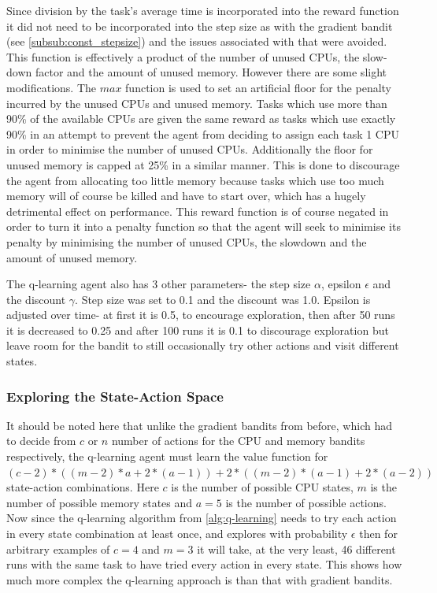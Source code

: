 Since division by the task’s average time is incorporated into the reward function it did not need to be incorporated into the step size as with the gradient bandit (see \ref{subsub:const_stepsize}) and the issues associated with that were avoided. This function is effectively a product of the number of unused CPUs, the slow-down factor and the amount of unused memory. However there are some slight modifications. The $max$ function is used to set an artificial floor for the penalty incurred by the unused CPUs and unused memory. Tasks which use more than 90\% of the available CPUs are given the same reward as tasks which use exactly 90\% in an attempt to prevent the agent from deciding to assign each task 1 CPU in order to minimise the number of unused CPUs. Additionally the floor for unused memory is capped at 25\% in a similar manner. This is done to discourage the agent from allocating too little memory because tasks which use too much memory will of course be killed and have to start over, which has a hugely detrimental effect on performance. This reward function is of course negated in order to turn it into a penalty function so that the agent will seek to minimise its penalty by minimising the number of unused CPUs, the slowdown and the amount of unused memory.

The q-learning agent also has 3 other parameters- the step size $\alpha$, epsilon $\epsilon$ and the discount $\gamma$. Step size was set to 0.1 and the discount was 1.0. Epsilon is adjusted over time- at first it is 0.5, to encourage exploration, then after 50 runs it is decreased to 0.25 and after 100 runs it is 0.1 to discourage exploration but leave room for the bandit to still occasionally try other actions and visit different states.

\subsubsection{Exploring the State-Action Space}

It should be noted here that unlike the gradient bandits from before, which had to decide from $c$ or $n$ number of actions for the CPU and memory bandits respectively, the q-learning agent must learn the value function for $(c-2)*((m-2)*a + 2*(a-1)) + 2*((m-2)*(a-1) + 2*(a-2))$ state-action combinations. Here $c$ is the number of possible CPU states, $m$ is the number of possible memory states and $a=5$ is the number of possible actions. Now since the q-learning algorithm from \ref{alg:q-learning} needs to try each action in every state combination at least once, and explores with probability $\epsilon$ then for arbitrary examples of $c=4$ and $m=3$ it will take, at the very least, 46 different runs with the same task to have tried every action in every state. This shows how much more complex the q-learning approach is than that with gradient bandits.

